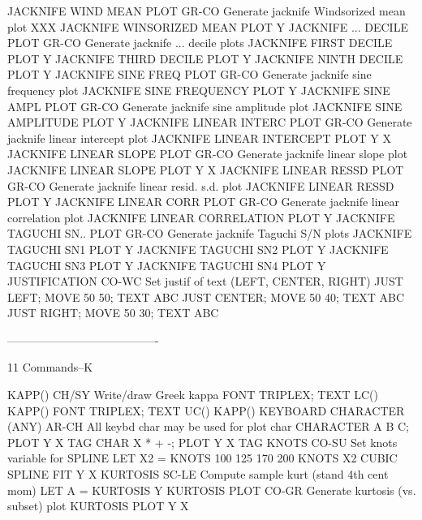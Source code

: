 JACKNIFE WIND MEAN PLOT     GR-CO Generate jacknife Windsorized mean plot
                                  XXX
                                  JACKNIFE WINSORIZED MEAN PLOT Y
JACKNIFE ... DECILE PLOT    GR-CO Generate jacknife ... decile plots
                                  JACKNIFE FIRST DECILE PLOT Y
                                  JACKNIFE THIRD DECILE PLOT Y
                                  JACKNIFE NINTH DECILE PLOT Y
JACKNIFE SINE FREQ PLOT     GR-CO Generate jacknife sine frequency plot
                                  JACKNIFE SINE FREQUENCY PLOT Y
JACKNIFE SINE AMPL PLOT     GR-CO Generate jacknife sine amplitude plot
                                  JACKNIFE SINE AMPLITUDE PLOT Y
JACKNIFE LINEAR INTERC PLOT GR-CO Generate jacknife linear intercept plot
                                  JACKNIFE LINEAR INTERCEPT PLOT Y X
JACKNIFE LINEAR SLOPE PLOT  GR-CO Generate jacknife linear slope plot
                                  JACKNIFE LINEAR SLOPE PLOT Y X
JACKNIFE LINEAR RESSD PLOT  GR-CO Generate jacknife linear resid. s.d. plot
                                  JACKNIFE LINEAR RESSD PLOT Y
JACKNIFE LINEAR CORR PLOT   GR-CO Generate jacknife linear correlation plot
                                  JACKNIFE LINEAR CORRELATION PLOT Y
JACKNIFE TAGUCHI SN.. PLOT  GR-CO Generate jacknife Taguchi S/N plots
                                  JACKNIFE TAGUCHI SN1 PLOT Y
                                  JACKNIFE TAGUCHI SN2 PLOT Y
                                  JACKNIFE TAGUCHI SN3 PLOT Y
                                  JACKNIFE TAGUCHI SN4 PLOT Y
JUSTIFICATION               CO-WC Set justif of text (LEFT, CENTER, RIGHT)
                                  JUST LEFT; MOVE 50 50; TEXT ABC
                                  JUST CENTER; MOVE 50 40; TEXT ABC
                                  JUST RIGHT; MOVE 50 30; TEXT ABC
 
----------------------------------------
 
11
Commands--K
 
KAPP()                      CH/SY Write/draw Greek kappa
                                  FONT TRIPLEX; TEXT LC() KAPP()
                                  FONT TRIPLEX; TEXT UC() KAPP()
KEYBOARD CHARACTER (ANY)    AR-CH All keybd char may be used for plot char
                                  CHARACTER A B C; PLOT Y X TAG
                                  CHAR X * + -; PLOT Y X TAG
KNOTS                       CO-SU Set knots variable for SPLINE
                                  LET X2 = KNOTS 100 125 170 200
                                  KNOTS X2
                                  CUBIC SPLINE FIT Y X
KURTOSIS                    SC-LE Compute sample kurt (stand 4th cent mom)
                                  LET A = KURTOSIS Y
KURTOSIS PLOT               CO-GR Generate kurtosis (vs. subset) plot
                                  KURTOSIS PLOT Y X
 
